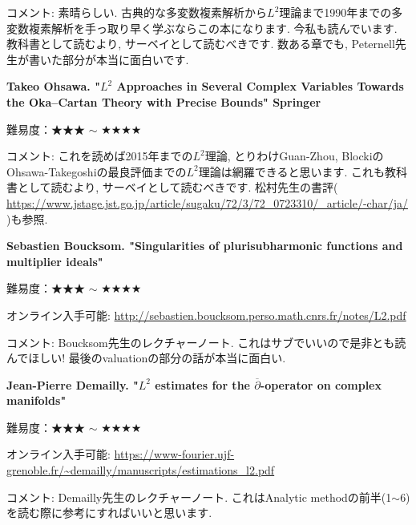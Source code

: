 コメント: 素晴らしい. 古典的な多変数複素解析から$L^2$理論まで1990年までの多変数複素解析を手っ取り早く学ぶならこの本になります. 今私も読んでいます. 教科書として読むより, サーベイとして読むべきです. 数ある章でも, Peternell先生が書いた部分が本当に面白いです. 
\vspace{8pt}

\textbf{Takeo Ohsawa.  "$L^2$ Approaches in Several Complex Variables
Towards the Oka–Cartan Theory with Precise Bounds" Springer}  　\vspace{-6pt} 

難易度：★★★ $\sim$ ★★★★  　\vspace{-6pt} 

コメント: これを読めば2015年までの$L^2$理論, とりわけGuan-Zhou, BlockiのOhsawa-Takegoshiの最良評価までの$L^2$理論は網羅できると思います. これも教科書として読むより, サーベイとして読むべきです.
松村先生の書評( \url{https://www.jstage.jst.go.jp/article/sugaku/72/3/72_0723310/_article/-char/ja/} )も参照. 
\vspace{8pt}

\textbf{Sebastien Boucksom. "Singularities of plurisubharmonic functions and multiplier ideals"}  　\vspace{-6pt} 

難易度：★★★ $\sim$ ★★★★  　\vspace{-6pt} 

オンライン入手可能: \url{http://sebastien.boucksom.perso.math.cnrs.fr/notes/L2.pdf}\vspace{-6pt}

コメント: Boucksom先生のレクチャーノート. これはサブでいいので是非とも読んでほしい! 最後のvaluationの部分の話が本当に面白い. 
\vspace{8pt}

\textbf{Jean-Pierre Demailly. "$L^2$ estimates for the $\overline{\partial}$-operator on complex manifolds"}  　\vspace{-6pt} 

難易度：★★★ $\sim$ ★★★★  　\vspace{-6pt} 

オンライン入手可能: \url{https://www-fourier.ujf-grenoble.fr/~demailly/manuscripts/estimations_l2.pdf}\vspace{-6pt}

コメント: Demailly先生のレクチャーノート. これはAnalytic methodの前半(1$\sim$6)を読む際に参考にすればいいと思います. 
\vspace{8pt}

